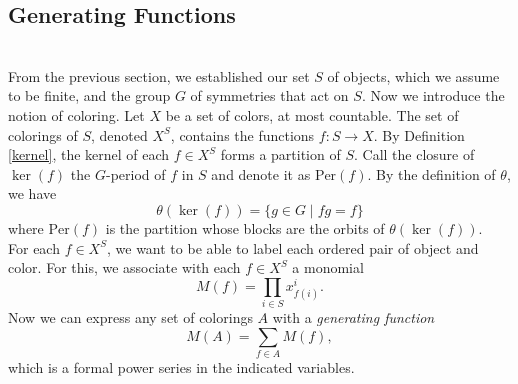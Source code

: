 \documentclass[psamsfonts]{amsart}
\theoremstyle{definition}
\theoremstyle{remark}
\numberwithin{equation}{section}
\begin{document}
\subsection{Generating Functions}\hfill\\
\indent From the previous section, we established our set $S$ of objects, which we assume to be finite, and the group $G$ of symmetries that act on $S$. Now we introduce the notion of coloring. Let $X$ be a set of colors, at most countable. The set of colorings of $S$, denoted $X^S$, contains the functions $f:S\to X$. By Definition \ref{kernel}, the kernel of each $f\in X^S$ forms a partition of $S$. Call the closure of $\ker(f)$ the $G$-period of $f$ in $S$ and denote it as $\text{Per}(f)$. By the definition of $\theta$, we have
\begin{equation}
    \theta(\ker(f))=\{g\in G \mid fg=f\}
\end{equation}
where $\text{Per}(f)$ is the partition whose blocks are the orbits of $\theta(\ker(f))$.\\
\indent For each $f\in X^S$, we want to be able to label each ordered pair of object and color. For this, we associate with each $f\in X^S$ a monomial
\begin{equation*}\label{generating function 1}
    M(f)=\prod_{i\in S}x^{i}_{f(i)}.
\end{equation*}
Now we can express any set of colorings $A$ with a \textit{generating function}
\begin{equation*}\label{generating function 2}
    M(A)=\sum_{f\in A}M(f),
\end{equation*}
which is a formal power series in the indicated variables.
\end{document}
